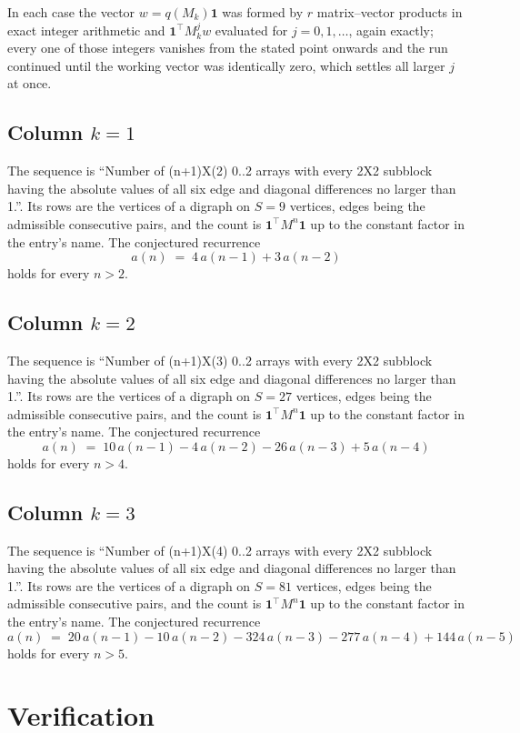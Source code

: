 \documentclass[11pt,a4paper]{article}
\theoremstyle{plain}
\theoremstyle{definition}
\begin{document}
In each case the vector $w=q(M_k)\mathbf{1}$ was formed by $r$ matrix--vector products in
exact integer arithmetic and $\mathbf{1}^{\!\top}M_k^{j}w$ evaluated for $j=0,1,\dots$,
again exactly; every one of those integers vanishes from the stated point onwards and the run
continued until the working vector was identically zero, which settles all larger $j$ at once.

\subsection*{Column $k=1$}
The sequence is ``Number of (n+1)X(2) 0..2 arrays with every 2X2 subblock having the absolute values of all six edge and diagonal differences no larger than 1.''. Its rows are the vertices of a digraph on
$S=9$ vertices, edges being the admissible consecutive pairs, and the count is
$\mathbf{1}^{\!\top}M^{n}\mathbf{1}$ up to the constant factor in the entry's name.
The conjectured recurrence
\[
a(n)\;=\;4\,a(n-1) + 3\,a(n-2)
\]
holds for every $n>2$.

\subsection*{Column $k=2$}
The sequence is ``Number of (n+1)X(3) 0..2 arrays with every 2X2 subblock having the absolute values of all six edge and diagonal differences no larger than 1.''. Its rows are the vertices of a digraph on
$S=27$ vertices, edges being the admissible consecutive pairs, and the count is
$\mathbf{1}^{\!\top}M^{n}\mathbf{1}$ up to the constant factor in the entry's name.
The conjectured recurrence
\[
a(n)\;=\;10\,a(n-1) - 4\,a(n-2) - 26\,a(n-3) + 5\,a(n-4)
\]
holds for every $n>4$.

\subsection*{Column $k=3$}
The sequence is ``Number of (n+1)X(4) 0..2 arrays with every 2X2 subblock having the absolute values of all six edge and diagonal differences no larger than 1.''. Its rows are the vertices of a digraph on
$S=81$ vertices, edges being the admissible consecutive pairs, and the count is
$\mathbf{1}^{\!\top}M^{n}\mathbf{1}$ up to the constant factor in the entry's name.
The conjectured recurrence
\[
a(n)\;=\;20\,a(n-1) - 10\,a(n-2) - 324\,a(n-3) - 277\,a(n-4) + 144\,a(n-5)
\]
holds for every $n>5$.

\section{Verification}
\end{document}

